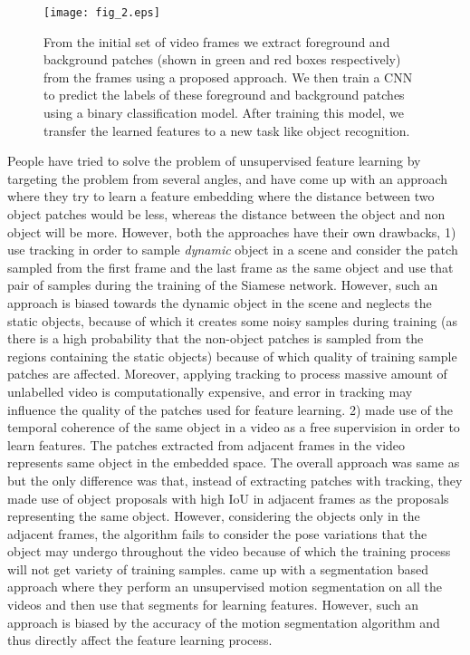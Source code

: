 \documentclass[10pt,twocolumn,letterpaper]{article}
\begin{document}
\begin{figure}[!t]
\centering
\texttt{[image: fig\_2.eps]}
\caption{From the initial set of video frames we extract foreground and background patches (shown in green and red boxes respectively) from the frames using a proposed approach. We then train a CNN to predict the labels of these foreground and background patches using a binary classification model. After training this model, we transfer the learned features to a new task like object recognition.}
\end{figure}

People have tried to solve the problem of unsupervised feature learning by targeting the problem from several angles, \cite{gao2016object} and \cite{wang2015unsupervised} have come up with an approach where they try to learn a feature embedding where the distance between two object patches would be less, whereas the distance between the object and non object will be more. However, both the approaches have their own drawbacks, 1) \cite{wang2015unsupervised} use tracking in order to sample \textit{dynamic} object in a scene and consider the patch sampled from the first frame and the last frame as the same object and use that pair of samples during the training of the Siamese network. However, such an approach is biased towards the dynamic object in the scene and neglects the static objects, because of which it creates some noisy samples during training (as there is a high probability that the non-object patches is sampled from the regions containing the static objects) because of which quality of training sample patches are affected. Moreover, applying tracking to process massive amount of unlabelled video is computationally expensive, and error in tracking may influence the quality of the patches used for feature learning. 2) \cite{gao2016object} made use of the temporal coherence of the same object in a video as a free supervision in order to learn features. The patches extracted from adjacent frames in the video represents same object in the embedded space. The overall approach was same as \cite{wang2015unsupervised} but the only difference was that, instead of extracting patches with tracking, they made use of object proposals with high IoU in adjacent frames as the proposals representing the same object. However, considering the objects only in the adjacent frames, the algorithm fails to consider the pose variations that the object may undergo throughout the video because of which the training process will not get variety of training samples. \cite{pathak2017learning} came up with a segmentation based approach where they perform an unsupervised motion segmentation on all the videos and then use that segments for learning features. However, such an approach is biased by the accuracy of the motion segmentation algorithm and thus directly affect the feature learning process.
\end{document}
